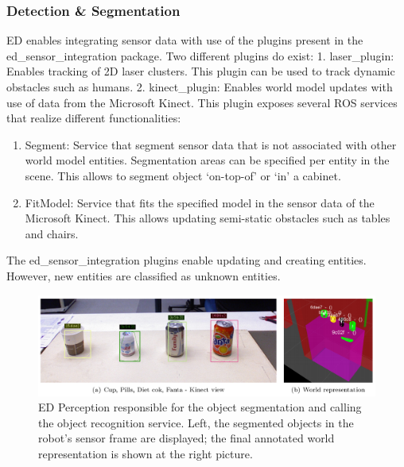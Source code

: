 \subsubsection{Detection \& Segmentation}
ED enables integrating sensor data with use of the plugins present in the ed\_sensor\_integration package. Two different plugins do exist:
1. laser\_plugin: Enables tracking of 2D laser clusters. This plugin can be used to track dynamic obstacles such as humans.
2. kinect\_plugin: Enables world model updates with use of data from the Microsoft Kinect\texttrademark. This plugin exposes several ROS services that realize different functionalities:
\begin{enumerate}[label=(\alph*)]
\item Segment: Service that segment sensor data that is not associated with other world model entities. Segmentation areas can be specified per entity in the scene. This allows to segment object ‘on-top-of’ or ‘in’ a cabinet.
\item FitModel: Service that fits the specified model in the sensor data of the Microsoft Kinect\texttrademark. This allows updating semi-static obstacles such as tables and chairs.
\end{enumerate}


The ed\_sensor\_integration plugins enable updating and creating entities. However, new entities are classified as unknown entities.
\begin{figure}[h]
    \centering
	\includegraphics[width = 1\linewidth]{Figures/ed_perception}
    \caption{ED Perception responsible for the object segmentation and calling the object recognition service. Left, the segmented objects in the robot's sensor frame are displayed; the final annotated world representation is shown at the right picture.}
	\label{fig:ed_perception}
\end{figure} 